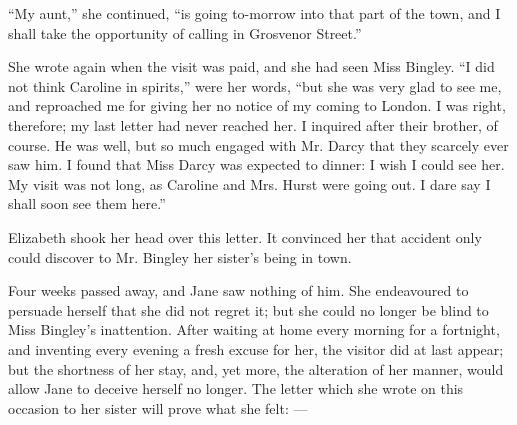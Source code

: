 \documentclass[10pt]{book}
\begin{document}
   “My aunt,” she continued, “is going to-morrow into that part of the
town, and I shall take the opportunity of calling in Grosvenor Street.”
  

   She wrote again when the visit was paid, and she had seen Miss Bingley.
“I did not think Caroline in spirits,” were her words, “but she was very
glad to see me, and reproached me for giving her no notice of my coming
to London. I was right, therefore; my last letter had never reached her.
I inquired after their brother, of course. He was well, but so much
engaged with Mr. Darcy that they scarcely ever saw him. I found that
Miss Darcy was expected to dinner: I wish I could see her. My visit was
not long, as Caroline and Mrs. Hurst were going out. I dare say I shall
soon see them here.”
  

   Elizabeth shook her head over this letter. It convinced her that
accident only could discover to Mr. Bingley her sister’s being in town.
  

   Four weeks passed away, and Jane saw nothing of him. She endeavoured to
persuade herself that she did not regret it; but she could no longer be
blind to Miss Bingley’s inattention. After waiting at home every morning
for a fortnight, and inventing every evening a fresh excuse for her, the
visitor did at last appear; but the shortness of her stay, and, yet
more, the alteration of her manner, would allow Jane to deceive herself
no longer. The letter which she wrote on this occasion to her sister
will prove what she felt:
   —
  
\end{document}
